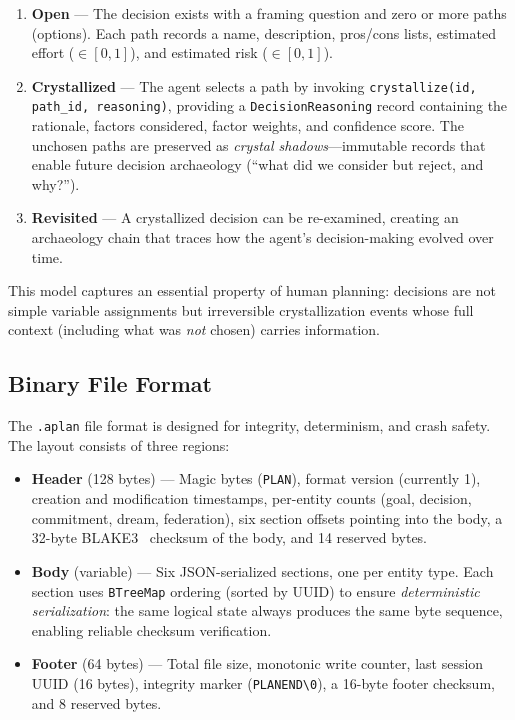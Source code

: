 \documentclass[10pt, twocolumn]{article}
\begin{document}
\begin{enumerate}[nosep, leftmargin=*]
  \item \textbf{Open} --- The decision exists with a framing question and zero or more paths (options). Each path records a name, description, pros/cons lists, estimated effort ($\in [0,1]$), and estimated risk ($\in [0,1]$).
  \item \textbf{Crystallized} --- The agent selects a path by invoking \texttt{crystallize(id, path\_id, reasoning)}, providing a \texttt{DecisionReasoning} record containing the rationale, factors considered, factor weights, and confidence score. The unchosen paths are preserved as \emph{crystal shadows}---immutable records that enable future decision archaeology (``what did we consider but reject, and why?'').
  \item \textbf{Revisited} --- A crystallized decision can be re-examined, creating an archaeology chain that traces how the agent's decision-making evolved over time.
\end{enumerate}

This model captures an essential property of human planning: decisions are not simple variable assignments but irreversible crystallization events whose full context (including what was \emph{not} chosen) carries information.

\subsection{Binary File Format}
\label{sec:format}

The \texttt{.aplan} file format is designed for integrity, determinism, and crash safety. The layout consists of three regions:

\begin{itemize}[nosep, leftmargin=*]
  \item \textbf{Header} (128 bytes) --- Magic bytes (\texttt{PLAN}), format version (currently 1), creation and modification timestamps, per-entity counts (goal, decision, commitment, dream, federation), six section offsets pointing into the body, a 32-byte BLAKE3~\cite{blake3_2020} checksum of the body, and 14 reserved bytes.
  \item \textbf{Body} (variable) --- Six JSON-serialized sections, one per entity type. Each section uses \texttt{BTreeMap} ordering (sorted by UUID) to ensure \emph{deterministic serialization}: the same logical state always produces the same byte sequence, enabling reliable checksum verification.
  \item \textbf{Footer} (64 bytes) --- Total file size, monotonic write counter, last session UUID (16 bytes), integrity marker (\texttt{PLANEND\textbackslash{}0}), a 16-byte footer checksum, and 8 reserved bytes.
\end{itemize}
\end{document}

